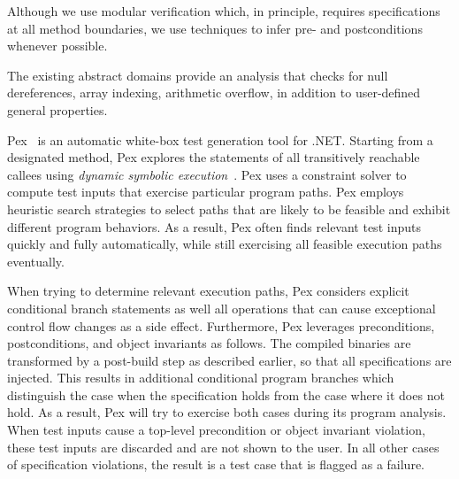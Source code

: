 \documentclass[10pt,twocolumn]{article}
\begin{document}
Although we use modular verification which, in principle, requires
specifications at all method boundaries, we use techniques to infer
pre- and postconditions whenever possible.

The existing abstract domains provide an analysis that checks for
null dereferences, array indexing, arithmetic overflow, in addition
to user-defined general properties.

Pex~\cite{pex} is an automatic white-box test generation tool for .NET.
Starting from a designated method,
Pex explores the statements of all transitively reachable callees
using 
\emph{dynamic symbolic execution}~\cite{godefroid05:dart}.
Pex uses a constraint solver to compute 
test inputs that exercise particular program paths.
Pex employs heuristic search strategies to select 
paths 
that are likely to 
be feasible and
exhibit different program behaviors.
As a result, 
Pex often finds relevant test inputs quickly and fully automatically,
while still exercising all feasible execution paths eventually.

When trying to 
determine relevant execution paths,
Pex considers explicit conditional branch statements
as well all operations that can cause exceptional control flow changes as a side effect.
Furthermore, Pex leverages preconditions, postconditions, and object invariants as follows.
The compiled binaries are transformed by a post-build step as described earlier,
so that all specifications are injected. 
This results in additional conditional program branches 
which distinguish the case when the specification holds from the case where it does not hold.
As a result, Pex will try to exercise both cases during its program analysis.
When test inputs cause a top-level precondition or object invariant violation,
these test inputs are discarded and are not shown to the user.
In all other cases of specification violations, the result is a test case that is flagged as a failure.

\end{document}
